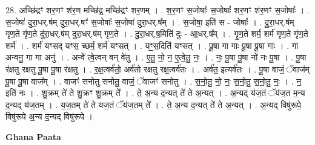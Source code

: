 \documentclass[17pt]{extarticle}
\begin{document}
28. अच्छि॑द्रꣳ शर॒णꣳ श॑र॒ण मच्छि॑द्र॒ मच्छि॑द्रꣳ शर॒णम् । . श॒र॒णꣳ स॒जोषाः᳚ स॒जोषाः᳚ शर॒णꣳ श॑र॒णꣳ स॒जोषाः᳚ । . स॒जोषा॑ दुरा॒धर्.ष॑म् दुरा॒धर्.षꣳ॑ स॒जोषाः᳚ स॒जोषा॑ दुरा॒धर्.ष᳚म् । . स॒जोषा॒ इति॑ स - जोषाः᳚ । . दु॒रा॒धर्.ष॑म् गृण॒ते गृ॑ण॒ते दु॑रा॒धर्.ष॑म् दुरा॒धर्.ष॑म् गृण॒ते । . दु॒रा॒धर्.ष॒मिति॑ दुः - आ॒धर्.ष᳚म् । . गृ॒ण॒ते शर्म॒ शर्म॑ गृण॒ते गृ॑ण॒ते शर्म॑ । . शर्म॑ यꣳसद् यꣳस॒ च्छर्म॒ शर्म॑ यꣳसत् । . यꣳ॒॒स॒दिति॑ यꣳसत् । . पू॒षा गा गाः पू॒षा पू॒षा गाः । . गा अन्वनु॒ गा गा अनु॑ । . अन्वे᳚ त्वे॒त्वन् वन् वे॑तु । . ए॒तु॒ नो॒ न॒ ए॒त्वे॒तु॒ नः॒ । . नः॒ पू॒षा पू॒षा नो॑ नः पू॒षा । . पू॒षा र॑क्षतु रक्षतु पू॒षा पू॒षा र॑क्षतु । . र॒क्ष॒त्वर्व॑तो॒ अर्व॑तो रक्षतु रक्ष॒त्वर्व॑तः । . अर्व॑त॒ इत्यर्व॑तः । . पू॒षा वाजं॒ ॅवाज॑म् पू॒षा पू॒षा वाज᳚म् । . वाजꣳ॑ सनोतु सनोतु॒ वाजं॒ ॅवाजꣳ॑ सनोतु । . स॒नो॒तु॒ नो॒ नः॒ स॒नो॒तु॒ स॒नो॒तु॒ नः॒ । . न॒ इति॑ नः । . शु॒क्रम् ते॑ ते शु॒क्रꣳ शु॒क्रम् ते᳚ । . ते॒ अ॒न्य द॒न्यत् ते॑ ते अ॒न्यत् । . अ॒न्यद् य॑ज॒तं ॅय॑ज॒त म॒न्य द॒न्यद् य॑ज॒तम् । . य॒ज॒तम् ते॑ ते यज॒तं ॅय॑ज॒तम् ते᳚ । . ते॒ अ॒न्य द॒न्यत् ते॑ ते अ॒न्यत् । . अ॒न्यद् विषु॑रूपे॒ विषु॑रूपे अ॒न्य द॒न्यद् विषु॑रूपे । \newline

\textbf{Ghana Paata } \newline
\end{document}
